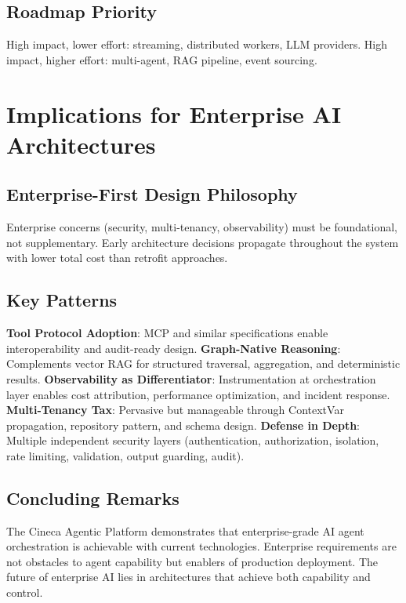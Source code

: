 \documentclass[a4paper,twoside]{sapthesis}
\begin{document}
\subsection{Roadmap Priority}

High impact, lower effort: streaming, distributed workers, LLM providers. High impact, higher effort: multi-agent, RAG pipeline, event sourcing.

\section{Implications for Enterprise AI Architectures}
\label{sec:implications}

\subsection{Enterprise-First Design Philosophy}

Enterprise concerns (security, multi-tenancy, observability) must be foundational, not supplementary. Early architecture decisions propagate throughout the system with lower total cost than retrofit approaches.

\subsection{Key Patterns}

\textbf{Tool Protocol Adoption}: MCP and similar specifications enable interoperability and audit-ready design. \textbf{Graph-Native Reasoning}: Complements vector RAG for structured traversal, aggregation, and deterministic results. \textbf{Observability as Differentiator}: Instrumentation at orchestration layer enables cost attribution, performance optimization, and incident response. \textbf{Multi-Tenancy Tax}: Pervasive but manageable through ContextVar propagation, repository pattern, and schema design. \textbf{Defense in Depth}: Multiple independent security layers (authentication, authorization, isolation, rate limiting, validation, output guarding, audit).

\subsection{Concluding Remarks}

The Cineca Agentic Platform demonstrates that enterprise-grade AI agent orchestration is achievable with current technologies. Enterprise requirements are not obstacles to agent capability but enablers of production deployment. The future of enterprise AI lies in architectures that achieve both capability and control.
\end{document}
